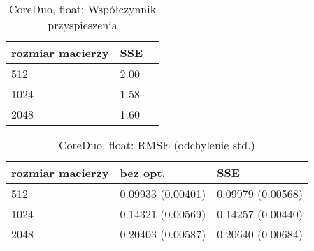 \documentclass[11pt,a4paper]{article}
\begin{document}
\begin{table}[h!]
\begin{center}
\begin{tabular}{lll}
\toprule
rozmiar macierzy &  SSE \\
\midrule
512  & 2.00 \\
1024 & 1.58 \\
2048 & 1.60 \\
\bottomrule
\end{tabular}
\caption{CoreDuo, float: Współczynnik przyspieszenia}
\end{center}
\end{table}

\begin{table}[h!]
\begin{center}
\begin{tabular}{lll}
\toprule
rozmiar macierzy & bez opt. & SSE \\
\midrule
512  & 0.09933 (0.00401) & 0.09979 (0.00568) \\
1024 & 0.14321 (0.00569) & 0.14257 (0.00440) \\
2048 & 0.20403 (0.00587) & 0.20640 (0.00684) \\
\bottomrule
\end{tabular}
\caption{CoreDuo, float: RMSE (odchylenie std.)}
\end{center}
\end{table}
\end{document}
